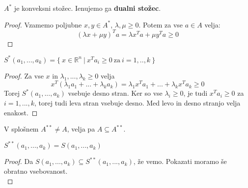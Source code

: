 \documentclass[11pt, a4paper]{article}
\begin{document}
    \begin{proposition}
        \(A^*\) je konveksni stožec. Ienujemo ga \textbf{dualni stožec}.
    \end{proposition}

    \begin{proof}
        Vzamemo poljubne \(x,y \in A^*\), \(\lambda, \mu \ge 0\). Potem za vse \(a \in A\) velja:
        \[
            (\lambda x + \mu y)^T a = \lambda x^T a + \mu y^T a \ge 0
        \]
    \end{proof}

    \begin{proposition}
        \(S^*(a_1,...,a_k) = \{\ x \in \mathbb{R}^n\ |\ x^T a_i \ge 0\ \text{za}\ i=1,..,k\ \}\)
    \end{proposition}

    \begin{proof}
        Za vse \(x\) in \(\lambda_1,...,\lambda_k \ge 0\) velja
        \[
            x^T (\lambda_1 a_1 + ... + \lambda_k a_k) = \lambda_1 x^T a_1 + ... + \lambda_k x^T a_k \ge 0
        \]
        Torej \(S^*(a_1,...,a_k)\) vsebuje desno stran.
        Ker so vse \(\lambda_i \ge 0\), je tudi \(x^T a_i \ge 0\) za \(i=1,...,k\), torej tudi leva stran vsebuje desno. Med levo in desno stranjo velja enakost.
    \end{proof}

    \begin{remark}
        V splošnem \(A^{**} \neq A\), velja pa \(A \subseteq A^{**}\).
    \end{remark}

    \begin{theorem}
        \(S^{**}(a_1,...,a_k)=S(a_1,...,a_k)\)
    \end{theorem}

    \begin{proof}
        Da \(S(a_1,...,a_k) \subseteq S^{**}(a_1,...,a_k)\), že vemo. Pokazati moramo še obratno vsebovanost. \\

    \end{proof}
\end{document}
